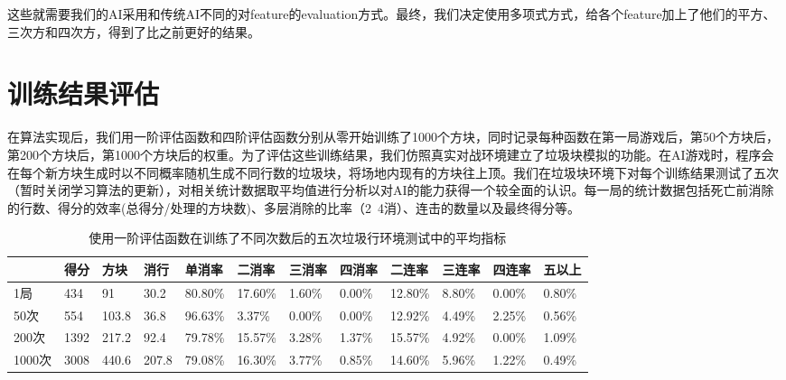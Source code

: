 \documentclass[10pt,UTF8]{article}
\begin{document}
\begin{multicols}{2}
这些就需要我们的AI采用和传统AI不同的对feature的evaluation方式。最终，我们决定使用多项式方式，给各个feature加上了他们的平方、三次方和四次方，得到了比之前更好的结果。

\section{训练结果评估}

在算法实现后，我们用一阶评估函数和四阶评估函数分别从零开始训练了1000个方块，同时记录每种函数在第一局游戏后，第50个方块后，第200个方块后，第1000个方块后的权重。为了评估这些训练结果，我们仿照真实对战环境建立了垃圾块模拟的功能。在AI游戏时，程序会在每个新方块生成时以不同概率随机生成不同行数的垃圾块，将场地内现有的方块往上顶。我们在垃圾块环境下对每个训练结果测试了五次（暂时关闭学习算法的更新），对相关统计数据取平均值进行分析以对AI的能力获得一个较全面的认识。每一局的统计数据包括死亡前消除的行数、得分的效率(总得分/处理的方块数)、多层消除的比率（2~4消）、连击的数量以及最终得分等。
\end{multicols}
\begin{table}[h]
    \centering
    \caption{使用一阶评估函数在训练了不同次数后的五次垃圾行环境测试中的平均指标}
    \begin{tabular}{@{}llllllllllll@{}}
    \toprule
          & 得分   & 方块    & 消行    & 单消率     & 二消率     & 三消率    & 四消率    & 二连率     & 三连率    & 四连率    & 五以上    \\ \midrule
    1局    & 434  & 91    & 30.2  & 80.80\% & 17.60\% & 1.60\% & 0.00\% & 12.80\% & 8.80\% & 0.00\% & 0.80\% \\
    50次   & 554  & 103.8 & 36.8  & 96.63\% & 3.37\%  & 0.00\% & 0.00\% & 12.92\% & 4.49\% & 2.25\% & 0.56\% \\
    200次  & 1392 & 217.2 & 92.4  & 79.78\% & 15.57\% & 3.28\% & 1.37\% & 15.57\% & 4.92\% & 0.00\% & 1.09\% \\
    1000次 & 3008 & 440.6 & 207.8 & 79.08\% & 16.30\% & 3.77\% & 0.85\% & 14.60\% & 5.96\% & 1.22\% & 0.49\% \\ \bottomrule
    \end{tabular}
\end{table}
\end{document}
